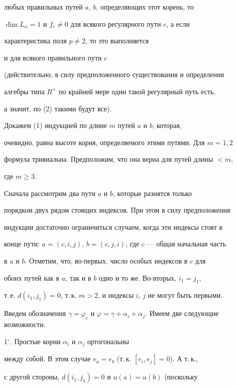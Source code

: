любых правильных путей $a$, $b$, определяющих этот корень, то


$\dim L_\alpha=1$ и $f_c\ne0$ для всякого регулярного пути $c$, а если


характеристика поля $p\ne 2$, то это выполняется


и для всякого правильного пути $c$


(действительно, в силу предположенного существования и определения


алгебры типа $R^+$ по крайней мере один такой регулярный путь есть,


а значит, по (2) такими будут все).





Докажем (1) индукцией по длине $m$ путей $a$ и $b$, которая,


очевидно, равна высоте корня, определяемого этими путями. Для $m=1,2$


формула тривиальна. Предположим, что она верна для путей длины $<m$,


где $m\ge3$.





Сначала рассмотрим два пути $a$ и $b$, которые разнятся только


порядком двух рядом стоящих индексов. При этом в силу предположения


индукции достаточно ограничиться случаем, когда эти индексы стоят в


конце пути: $a=(c,i,j)$, $b=(c,j,i)$, где $c$ --- общая начальная часть


в $a$ и $b$. Отметим, что, во-первых, число особых индексов в $c$ для


обоих путей как в $a$, так и в $b$ одно и то же. Во-вторых, $i_1=j_1$,


т.\,е. $d(i_1,j_1)=0$, т.\,к. $m>2$, и индексы $i$, $j$ не могут быть первыми.


Введем обозначения $\gamma =\varphi_c$ и $\varphi =\gamma +\alpha_i+


\alpha_j$. Имеем две следующие возможности.





1$^\circ $. Простые корни $\alpha_i$ и $\alpha_j$ ортогональны


между собой. В этом случае $e_a=e_b$ (т.\,к. $[e_i,e_j]=0$). А т.\,к.,


с другой стороны, $d(i_1,j_1)=0$ и $u(a)=u(b)$ (поскольку


